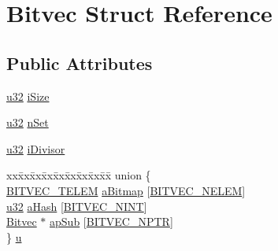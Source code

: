 \hypertarget{struct_bitvec}{\section{Bitvec Struct Reference}
\label{struct_bitvec}
}
\subsection*{Public Attributes}
\begin{DoxyCompactItemize}
\item 
\hyperlink{sqlite3_8c_a03ad5adfaeb9b7640dde78a0cc390319}{u32} \hyperlink{struct_bitvec_ab36df8ece98aee080bae6de28c237de8}{i\-Size}
\item 
\hyperlink{sqlite3_8c_a03ad5adfaeb9b7640dde78a0cc390319}{u32} \hyperlink{struct_bitvec_ad6811debae9b972f2d94d667e994e3f6}{n\-Set}
\item 
\hyperlink{sqlite3_8c_a03ad5adfaeb9b7640dde78a0cc390319}{u32} \hyperlink{struct_bitvec_a22cdb23eb424e07b6ce922de018a83d9}{i\-Divisor}
\item 
\begin{tabbing}
xx\=xx\=xx\=xx\=xx\=xx\=xx\=xx\=xx\=\kill
union \{\\
\>\hyperlink{sqlite3_8c_a1529231c74dd2f84855767bd45a4a128}{BITVEC\_TELEM} \hyperlink{struct_bitvec_ad0c8d2bbafe74c346a007004086fb56d}{aBitmap} \mbox{[}\hyperlink{sqlite3_8c_a88b5a6f3a5220c5b59494a0945b25300}{BITVEC\_NELEM}\mbox{]}\\
\>\hyperlink{sqlite3_8c_a03ad5adfaeb9b7640dde78a0cc390319}{u32} \hyperlink{struct_bitvec_adcaa47179c109270041bf59f8fe9f8ff}{aHash} \mbox{[}\hyperlink{sqlite3_8c_a6631a81736378abeb3cd82ff1d373c7f}{BITVEC\_NINT}\mbox{]}\\
\>\hyperlink{struct_bitvec}{Bitvec} $\ast$ \hyperlink{struct_bitvec_ab4942527f1862bbd8e1ffe45486d1541}{apSub} \mbox{[}\hyperlink{sqlite3_8c_ac3a46fc9cd900e383c175cdd5eb3f633}{BITVEC\_NPTR}\mbox{]}\\
\} \hyperlink{struct_bitvec_a2ef3423696109b6b699aee3e736c4ed6}{u}\\

\end{tabbing}\end{DoxyCompactItemize}


